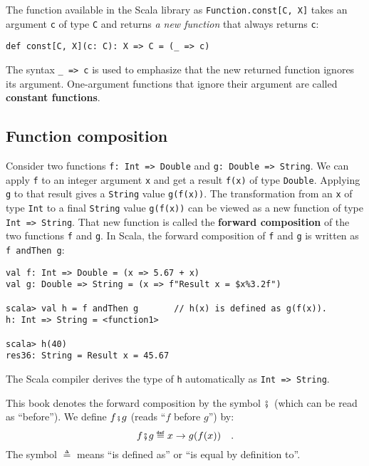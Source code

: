 The function available in the Scala library as \lstinline!Function.const[C, X]!
takes an argument \lstinline!c! of type \lstinline!C! and returns
\emph{a new function} that always returns \lstinline!c!:
\begin{lstlisting}
def const[C, X](c: C): X => C = (_ => c)
\end{lstlisting}
The syntax \lstinline!_ => c! is used to emphasize that the new returned
function ignores its argument. One-argument functions that ignore
their argument are called \textbf{constant functions}.

\subsection{Function composition\label{subsec:Examples-of-fully-parametric}}

Consider two functions \lstinline!f: Int => Double!
and \lstinline!g: Double => String!. We can apply \lstinline!f!
to an integer argument \lstinline!x! and get a result \lstinline!f(x)!
of type \lstinline!Double!. Applying \lstinline!g! to that result
gives a \lstinline!String! value \lstinline!g(f(x))!. The transformation
from an \lstinline!x! of type \lstinline!Int! to a final \lstinline!String!
value \lstinline!g(f(x))! can be viewed as a new function of type
\lstinline!Int => String!. That new function is called the \textbf{forward
composition} of the two functions \lstinline!f!
and \lstinline!g!. In Scala, the forward composition of \lstinline!f!
and \lstinline!g! is written as \lstinline!f andThen g!:
\begin{lstlisting}
val f: Int => Double = (x => 5.67 + x)
val g: Double => String = (x => f"Result x = $x%3.2f")

scala> val h = f andThen g       // h(x) is defined as g(f(x)).
h: Int => String = <function1>

scala> h(40)
res36: String = Result x = 45.67
\end{lstlisting}
The Scala compiler derives the type of \lstinline!h! automatically
as \lstinline!Int => String!.

This book denotes the forward composition by the symbol ${\displaystyle \bef}$
(which can be read as \textsf{``}before\textsf{''}). We define $f\bef g$ (reads \textsf{``}$f$
before $g$\textsf{''}) by:
\begin{equation}
f\bef g\triangleq x\rightarrow g(f(x))\quad.\label{eq:def-of-forward-composition}
\end{equation}
The symbol $\triangleq$ means \textsf{``}is defined as\textsf{''} or \textsf{``}is equal
by definition to\textsf{''}.

